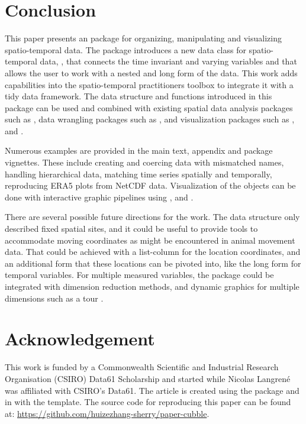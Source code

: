 \documentclass[
  shortnames]{jss}
\begin{document}
\hypertarget{conclude}{%
\section{Conclusion}\label{conclude}}

This paper presents an  package  for organizing, manipulating and visualizing spatio-temporal data. The package introduces a new data class for spatio-temporal data, , that connects the time invariant and varying variables and that allows the user to work with a nested and long form of the data. This work adds capabilities into the spatio-temporal practitioners toolbox to integrate it with a tidy data framework. The data structure and functions introduced in this package can be used and combined with existing spatial data analysis packages such as , data wrangling packages such as , and visualization packages such as ,  and .

Numerous examples are provided in the main text, appendix and package vignettes. These include creating and coercing data with mismatched names, handling hierarchical data, matching time series spatially and temporally, reproducing ERA5 plots from NetCDF data. Visualization of the  objects can be done with interactive graphic pipelines using ,  and .

There are several possible future directions for the work. The data structure only described fixed spatial sites, and it could be useful to provide tools to accommodate moving coordinates as might be encountered in animal movement data. That could be achieved with a list-column for the location coordinates, and an additional form that these locations can be pivoted into, like the long form for temporal variables. For multiple measured variables, the  package could be integrated with dimension reduction methods, and dynamic graphics for multiple dimensions such as a tour \citep{wickham_tourr_2011}.

\hypertarget{acknowledgement}{%
\section{Acknowledgement}\label{acknowledgement}}

This work is funded by a Commonwealth Scientific and Industrial Research Organisation (CSIRO) Data61 Scholarship and started while Nicolas Langrené was affiliated with CSIRO's Data61. The article is created using the package  \citep{knitr} and  \citep{rmarkdown} in  with the  template. The source code for reproducing this paper can be found at: \url{https://github.com/huizezhang-sherry/paper-cubble}.


\end{document}
